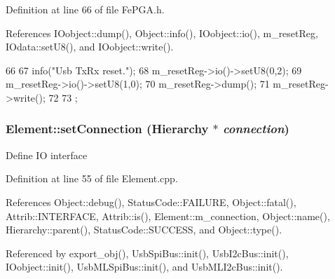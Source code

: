 Definition at line 66 of file FePGA.h.

References IOobject::dump(), Object::info(), IOobject::io(), m\_\-resetReg, IOdata::setU8(), and IOobject::write().


\begin{DoxyCode}
66                  {
67     info("Usb TxRx reset.");
68     m_resetReg->io()->setU8(0,2);
69     m_resetReg->io()->setU8(1,0); 
70     m_resetReg->dump();
71     m_resetReg->write();
72     
73   };
\end{DoxyCode}
\hypertarget{classElement_ab476b4b1df5954141ceb14f072433b89}{
\subsubsection[{setConnection}]{ Element::setConnection ({\bf Hierarchy} $\ast$ {\em connection})}}
\label{classElement_ab476b4b1df5954141ceb14f072433b89}
Define IO interface 

Definition at line 55 of file Element.cpp.

References Object::debug(), StatusCode::FAILURE, Object::fatal(), Attrib::INTERFACE, Attrib::is(), Element::m\_\-connection, Object::name(), Hierarchy::parent(), StatusCode::SUCCESS, and Object::type().

Referenced by export\_\-obj(), UsbSpiBus::init(), UsbI2cBus::init(), IOobject::init(), UsbMLSpiBus::init(), and UsbMLI2cBus::init().


